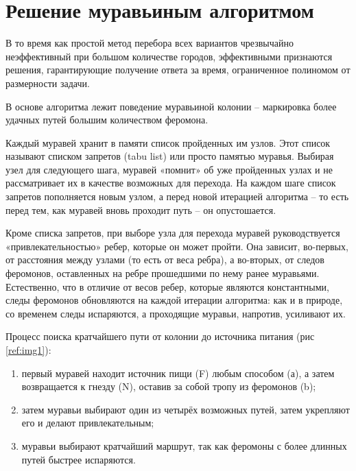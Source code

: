 \section{Решение муравьиным алгоритмом}

В то время как простой метод перебора всех вариантов чрезвычайно
неэффективный при большом количестве городов,
эффективными признаются решения, гарантирующие получение
ответа за время, ограниченное полиномом от размерности задачи.

В основе алгоритма лежит поведение муравьиной колонии -- маркировка более удачных
путей большим количеством феромона.

Каждый муравей хранит в памяти список пройденных им узлов. Этот список называют списком запретов (tabu list) или просто памятью муравья. Выбирая узел для следующего шага, муравей «помнит» об уже пройденных узлах и не рассматривает их в качестве возможных для перехода. На каждом шаге список запретов пополняется новым узлом, а перед новой итерацией алгоритма – то есть перед тем, как муравей вновь проходит путь – он опустошается.

Кроме списка запретов, при выборе узла для перехода муравей руководствуется «привлекательностью» ребер, которые он может пройти. Она зависит, во-первых, от расстояния между узлами (то есть от веса ребра), а во-вторых, от следов феромонов, оставленных на ребре прошедшими по нему ранее муравьями. Естественно, что в отличие от весов ребер, которые являются константными, следы феромонов обновляются на каждой итерации алгоритма: как и в природе, со временем следы испаряются, а проходящие муравьи, напротив, усиливают их.




Процесс поиска кратчайшего пути от колонии до источника питания (рис \ref{ref:img1}):



\begin{figure}[ht!]
\end{figure}

\begin{enumerate}
	\item первый муравей находит источник пищи (F) любым способом (а), а затем возвращается к гнезду (N), оставив за собой тропу из феромонов (b);
	\item затем муравьи выбирают один из четырёх возможных путей, затем укрепляют его и делают привлекательным;
	\item муравьи выбирают кратчайший маршрут, так как феромоны с более длинных путей быстрее испаряются.
\end{enumerate}

